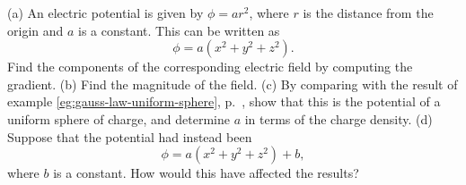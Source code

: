 (a) An electric potential is given by $\phi=ar^2$, where $r$ is the distance
from the origin and $a$ is a constant. This can be written as
\begin{equation*}
  \phi = a(x^2+y^2+z^2).
\end{equation*}
Find the components of the corresponding electric field by computing the
gradient.\hwendpart
(b) Find the magnitude of the field.\answercheck\hwendpart
(c) By comparing with the result of example \ref{eg:gauss-law-uniform-sphere},
p.~\pageref{eg:gauss-law-uniform-sphere}, show that this is the potential of
a uniform sphere of charge, and determine $a$ in terms of the charge density.\answercheck
(d) Suppose that the potential had instead been
\begin{equation*}
  \phi = a(x^2+y^2+z^2)+b,
\end{equation*}
where $b$ is a constant. How would this have affected the results?
